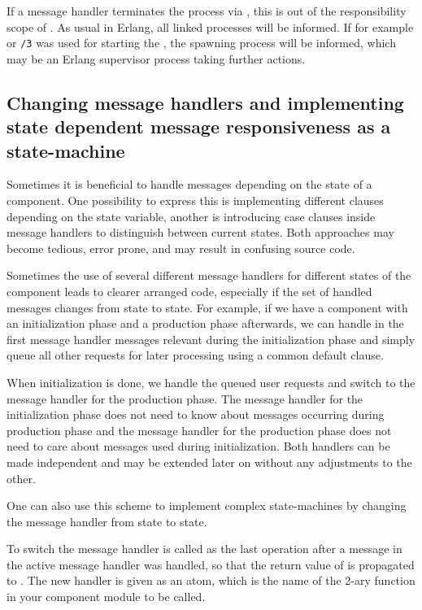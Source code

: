 If a message handler terminates the process via ,
this is out of the responsibility scope of . As
usual in Erlang, all linked processes will be informed. If for example
 or \texttt{/3} was used for
starting the , the spawning process will be
informed, which may be an Erlang supervisor process taking further actions.

\subsection{Changing message handlers and implementing state dependent
 message responsiveness as a state-machine}
\label{sec:gen_component:change_handler}

Sometimes it is beneficial to handle messages depending on the state of a
component. One possibility to express this is implementing different clauses
depending on the state variable, another is introducing case clauses inside
message handlers to distinguish between current states. Both approaches may
become tedious, error prone, and may result in confusing source code.

Sometimes the use of several different message handlers for different states
of the component leads to clearer arranged code, especially if the set of
handled messages changes from state to state. For example, if we have a
component with an initialization phase and a production phase afterwards, we
can handle in the first message handler messages relevant during the
initialization phase and simply queue all other requests for later
processing using a common default clause.

When initialization is done, we handle the queued user requests and switch
to the message handler for the production phase. The message handler for the
initialization phase does not need to know about messages occurring during
production phase and the message handler for the production phase does not
need to care about messages used during initialization. Both handlers can be
made independent and may be extended later on without any adjustments to the
other.

One can also use this scheme to implement complex state-machines by changing
the message handler from state to state.

To switch the message handler
 is called as
the last operation after a message in the active message handler was
handled, so that the return value of
 is propagated to
.  The new handler is given as an atom, which is
the name of the 2-ary function in your component module to be called.

